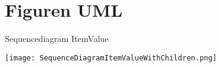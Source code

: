 \chapter{Figuren UML}
\label{appendix:FiguresUML}

\begin{graphic}
    \captionsetup{type=figure}
    \caption{Sequencediagram ItemValue}
    \texttt{[image: SequenceDiagramItemValueWithChildren.png]}
    \label{appendix:SequenceDiagramItemValueWithChildren}
\end{graphic}
